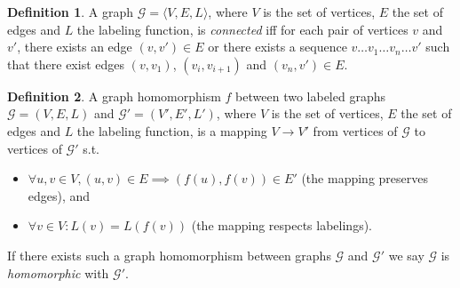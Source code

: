 \documentclass{article}
\theoremstyle{definition}
\newtheorem{definition}{Definition}[section]
\newcommand{\triple}[1]{\ensuremath{\langle #1 \rangle}}
\newcommand{\pair}[1]{\ensuremath{\left(#1\right)}}
\newcommand{\graph}[1]{\ensuremath{\mathcal{#1}}}
\begin{document}
\begin{definition}
A graph $\graph{G} = \triple{V,E,L}$, where $V$ is the set of vertices, $E$ the set of edges and $L$ the labeling function, is \emph{connected} iff for each pair of vertices $v$ and $v'$, there exists an edge $\pair{v,v'} \in E$ or there exists a sequence $v \ldots v_{1} \ldots v_{n} \ldots v'$ such that there exist edges $\pair{v,v_{1}}$, $\pair{v_{i},v_{i+1}}$ and $\pair{v_{n},v'} \in E$.
\end{definition}


\begin{definition}
A graph homomorphism $f$ between two labeled graphs $\graph{G} = (V,E,L)$ and $\graph{G'} = (V',E',L')$, where $V$ is the set of vertices, $E$ the set of edges and $L$ the labeling function, is a mapping $V \rightarrow V'$ from vertices of $\graph{G}$ to vertices of $\graph{G'}$ s.t. 
\begin{itemize}
\item $\forall u,v \in V, \pair{u,v} \in E \implies \pair{f(u),f(v)} \in E'$ (the mapping preserves edges), and 
\item $\forall v \in V : L(v) = L(f(v))$ (the mapping respects labelings).
\end{itemize}
If there exists such a graph homomorphism between graphs $\graph{G}$ and $\graph{G'}$ we say $\graph{G}$ is \emph{homomorphic} with $\graph{G'}$.
\end{definition}
\end{document}
